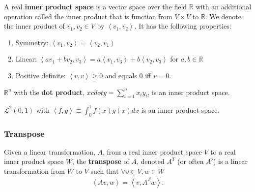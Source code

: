 \documentclass[compress]{beamer}
\def\R{\mathbb{R}}
\newcommand{\iprod}[2]{\left\langle {#1} , {#2} \right\rangle}
\begin{document}
\begin{frame}
  \begin{definition}
    A real \textbf{inner product space} is a vector space over the field
    $\R$ with an additional operation called the inner product that is
    function from $V \times V$ to $\mathbb{R}$. We denote the inner
    product of $v_1, v_2 \in V$ by $\iprod{v_1}{v_2}$. It has the
    following properties:
    \begin{enumerate}
    \item Symmetry: $\iprod{v_1}{v_2} = \iprod{v_2}{v_1}$
    \item Linear: $\iprod{a v_1 + b v_2}{v_3} = a \iprod{v_1}{v_3} + b
      \iprod{v_2}{v_3}$ for $a, b \in \R$
    \item Positive definite: $\iprod{v}{v} \geq 0$ and equals $0$ iff
      $v=0$. 
    \end{enumerate}  
  \end{definition}
\end{frame}

\begin{frame}
  \begin{example}
    $\R^n$ with the \textbf{dot product}, $x cdot y = \sum_{i=1}^n x_i
    y_i$, is an inner product space. 
  \end{example}
  
  \begin{example}
    $\mathcal{L}^2(0,1)$ with $\iprod{f}{g} \equiv \int_0^1 f(x) g(x)
    dx$ is an inner product space.
  \end{example}
\end{frame}

\begin{frame}
  \frametitle{Transpose}
  \begin{definition}
    Given a linear transformation, $A$, from a real inner product space
    $V$ to a real inner product space $W$, the
    \textbf{transpose} of $A$, denoted $A^T$ (or often $A'$) is a
    linear transformation from $W$ to $V$ such that $\forall v \in V, w
    \in W$
    \begin{align*}
      \iprod{A v}{w} = \iprod{v}{A^T w}.
    \end{align*}
  \end{definition}
\end{frame}
\end{document}
